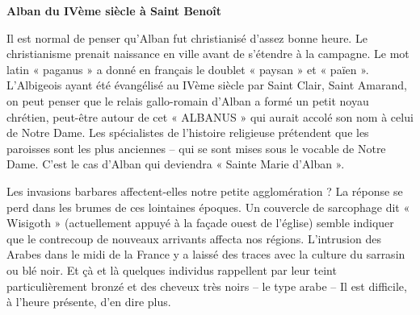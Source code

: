 
\thispagestyle{plain}

\vspace*{12mm}

\begin{center}
    {\Large\bfseries Alban du IVème siècle à Saint Benoît}
\end{center}

\vspace{18mm}

\noindent
Il est normal de penser qu'Alban fut christianisé d'assez bonne heure.
Le christianisme prenait naissance en ville avant de s'étendre à la
campagne. Le mot latin « paganus » a donné en français le doublet
« paysan » et « païen ». L'Albigeois ayant été évangélisé au IVème
siècle par Saint Clair, Saint Amarand, on peut penser que le relais
gallo-romain d'Alban a formé un petit noyau chrétien, peut-être autour
de cet « ALBANUS » qui aurait accolé son nom à celui de Notre Dame.
Les spécialistes de l'histoire religieuse prétendent que les paroisses
sont les plus anciennes -- qui se sont mises sous le vocable de Notre
Dame. C'est le cas d'Alban qui deviendra « Sainte Marie d'Alban ».

\par\vspace{12mm}

\noindent
Les invasions barbares affectent-elles notre petite agglomération ?
La réponse se perd dans les brumes de ces lointaines époques. Un
couvercle de sarcophage dit « Wisigoth » (actuellement appuyé à la
façade ouest de l'église) semble indiquer que le contrecoup de nouveaux
arrivants affecta nos régions. L'intrusion des Arabes dans le midi de
la France y a laissé des traces avec la culture du sarrasin ou blé noir.
Et çà et là quelques individus rappellent par leur teint particulièrement
bronzé et des cheveux très noirs -- le type arabe -- Il est difficile,
à l'heure présente, d'en dire plus.

\vfill
